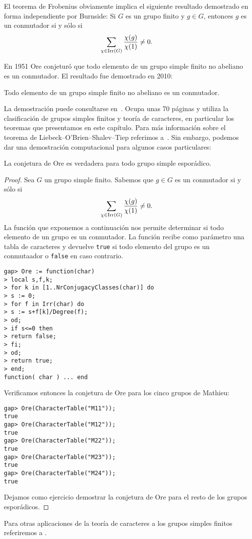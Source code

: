 El teorema de Frobenius obviamente implica 
el siguiente resultado demostrado en forma independiente 
por Burnside: Si $G$ es un 
grupo finito y $g\in G$, entonces $g$ 
es un conmutador si y sólo si 
\[
\sum_{\chi\in\operatorname{Irr}(G)}\frac{\chi(g)}{\chi(1)}\ne 0.
\]

En 1951 Ore conjeturó que todo elemento de un grupo simple finito no abeliano es un conmutador. 
El resultado fue demostrado en 2010:

\begin{theorem}
Todo elemento de un grupo simple finito no abeliano es un conmutador. 
\end{theorem}

La demostración puede consultarse en~\cite{MR2654085}. Ocupa unas 70 páginas y 
utiliza la clasificación de grupos simples finitos y teoría de caracteres, 
en particular los teoremas que presentamos en este capítulo. Para más información sobre 
el teorema de Liebeck--O'Brien--Shalev--Tiep
referimos a~\cite{MR3289286}. Sin embargo, podemos dar una demostración computacional
para algunos casos particulares:

\begin{proposition}
La conjetura de Ore es verdadera para todo grupo simple esporádico. 
\end{proposition}

\begin{proof}
Sea $G$ un grupo simple finito. 
Sabemos que $g\in G$ es un conmutador si y sólo si 
\[
\sum_{\chi\in\operatorname{Irr}(G)}\frac{\chi(g)}{\chi(1)}\ne 0.
\]
La función que exponemos a continuación nos permite determinar 
si todo elemento de un grupo es un conmutador. La función recibe como parámetro una tabla de caracteres y 
devuelve \lstinline{true} si todo elemento del grupo es un conmutaador o \lstinline{false} en caso contrario. 
\begin{lstlisting}
gap> Ore := function(char) 
> local s,f,k;
> for k in [1..NrConjugacyClasses(char)] do
> s := 0;
> for f in Irr(char) do
> s := s+f[k]/Degree(f);  
> od;
> if s<=0 then
> return false;
> fi;
> od;
> return true;
> end;
function( char ) ... end
\end{lstlisting}
Verificamos entonces la conjetura de Ore para los cinco grupos de Mathieu:
\begin{lstlisting}
gap> Ore(CharacterTable("M11"));
true
gap> Ore(CharacterTable("M12"));
true
gap> Ore(CharacterTable("M22"));
true
gap> Ore(CharacterTable("M23"));
true
gap> Ore(CharacterTable("M24"));
true
\end{lstlisting}
Dejamos como ejercicio demostrar la conjetura de Ore para el resto de los grupos esporádicos. 
\end{proof}

Para otras aplicaciones de la teoría de caracteres a los grupos simples finitos referiremos a 
\cite{MR3821142}. 
